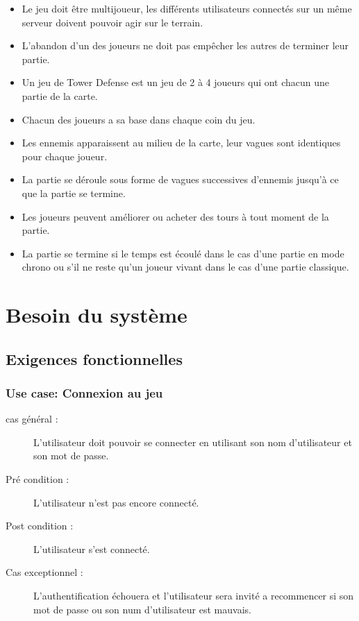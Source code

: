\documentclass[10pt,a4paper]{article}
\begin{document}
\begin{itemize}
	\item Le jeu doit être multijoueur, les différents \glspl{utilisateur} connectés sur un même \gls{serveur} doivent pouvoir agir sur le terrain.
   \item  L'abandon d'un des \glspl{joueur} ne doit pas empêcher les autres de terminer leur partie. 
   \item Un jeu de Tower Defense est un jeu de 2 à 4 \glspl{joueur} qui ont chacun une partie de la carte.
   \item Chacun des \glspl{joueur} a sa base dans chaque coin du jeu.
   \item Les ennemis apparaissent au milieu de la carte, leur vagues sont identiques pour chaque \gls{joueur}.
   \item La partie se déroule sous forme de vagues successives d’ennemis jusqu’à ce que la partie se termine.
   \item  Les \glspl{joueur} peuvent améliorer ou acheter des tours à tout moment de la partie.
   \item  La partie se termine si le temps est écoulé dans le cas d’une partie en mode chrono ou s’il ne reste qu’un \gls{joueur} vivant dans le cas d’une partie classique.
\end{itemize}
\newpage
\section{Besoin du système}
\subsection{Exigences fonctionnelles}
\subsubsection{Use case: Connexion au jeu}

\begin{description}
	\item[cas général :] L'\gls{utilisateur} doit pouvoir se connecter en utilisant son nom d'\gls{utilisateur} et son mot de passe.
    \item[Pré condition :] L'\gls{utilisateur} n'est pas encore connecté.
    \item[Post condition :] L'\gls{utilisateur} s'est connecté.
    \item[Cas exceptionnel :] L'authentification échouera et l'\gls{utilisateur} sera invité a recommencer si son mot de passe ou son num d'\gls{utilisateur} est mauvais.
\end{description}
\end{document}
